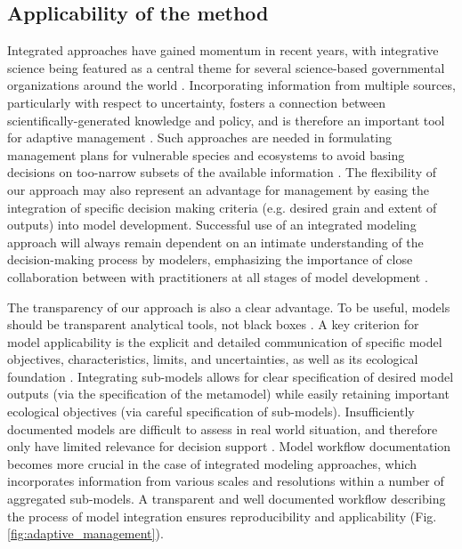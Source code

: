 \subsection*{Applicability of the method}
Integrated approaches have gained momentum in recent years, with integrative science being featured as a central theme for several science-based governmental organizations around the world \citep[e.g.][]{Bernier2013}. 
Incorporating information from multiple sources, particularly with respect to uncertainty,  fosters a connection between scientifically-generated knowledge and policy, and is therefore an important tool for adaptive management \citep[][Fig. \ref{fig:adaptive_management}; ]{Rehme2011}.
Such approaches are needed in formulating management plans for vulnerable species and ecosystems to avoid basing decisions on too-narrow subsets of the available information \citep{Dawson2011}.
The flexibility of our approach may also represent an advantage for management by easing the integration of specific decision making criteria (e.g. desired grain and extent of outputs) into model development. 
Successful use of an integrated modeling approach will always remain dependent on an intimate understanding of the decision-making process by modelers, emphasizing the importance of close collaboration between with practitioners at all stages of model development \citep{Guisan2013}.

The transparency of our approach is also a clear advantage. 
To be useful, models should be transparent analytical tools, not black boxes \citep{Addison2013}. 
A key criterion for model applicability is the explicit and detailed communication of specific model objectives, characteristics, limits, and uncertainties, as well as its ecological foundation \citep{Guisan2013}.
Integrating sub-models allows for clear specification of desired model outputs (via the specification of the metamodel) while easily retaining important ecological objectives (via careful specification of sub-models).
Insufficiently documented models are difficult to assess in real world situation, and therefore only have limited relevance for decision support \citep{Addison2013, Guisan2013}.
Model workflow documentation becomes more crucial in the case of integrated modeling approaches, which incorporates information from various scales and resolutions within a number of aggregated sub-models. 
A transparent and well documented workflow describing the process of model integration ensures reproducibility and applicability (Fig. \ref{fig:adaptive_management}). 

